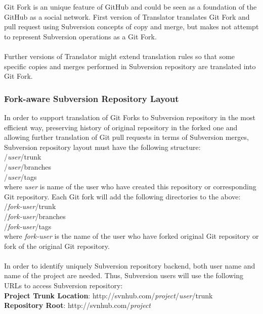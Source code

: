 Git Fork is an unique feature of GitHub and could be seen as a foundation of the GitHub as a social network. 
First version of Translator translates Git Fork and pull request using Subversion concepts of copy and merge,
but makes not attempt to represent Subversion operations as a Git Fork.\\\\
Further versions of Translator might extend translation
rules so that some specific copies and merges performed in Subversion repository are translated into Git Fork.

\subsubsection{Fork-aware Subversion Repository Layout}

In order to support translation of Git Forks to Subversion repository in the most efficient way, 
preserving history of original repository in the forked one and allowing further translation of
Git pull requests in terms of Subversion merges, 
Subversion repository layout must have the following structure:\\

/\emph{user}/trunk\\
/\emph{user}/branches\\
/\emph{user}/tags\\

where \emph{user} is name of the user who have created this repository or 
corresponding Git repository. Each Git fork will add the following directories to the above:\\

/\emph{fork-user}/trunk\\
/\emph{fork-user}/branches\\
/\emph{fork-user}/tags\\

where \emph{fork-user} is the name of the user who have forked original Git repository or fork of the original Git repository.
\\\\
In order to identify uniquely Subversion repository backend, both user name and name of the project are needed. Thus,
Subversion users will use the following URLs to access Subversion repository:\\

\textbf{Project Trunk Location}: http://svnhub.com/\emph{project}/\emph{user}/trunk\\
\textbf{Repository Root}: http://svnhub.com/\emph{project}\\

